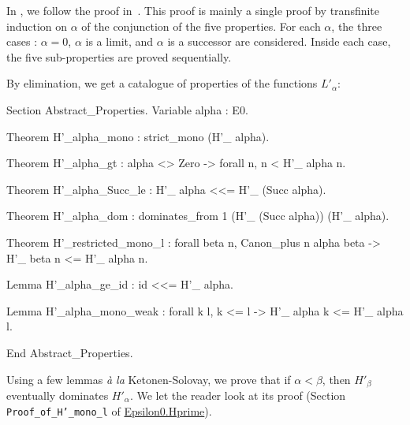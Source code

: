 
In \coq{}, we follow the  proof in~\cite{KS81}. This proof is mainly a single  proof by transfinite induction on $\alpha$ of the conjunction of the five properties.
For each $\alpha$, the three cases : $\alpha=0$, $\alpha$ is a limit, and 
$\alpha$ is a successor are considered. Inside each case, the five sub-properties are proved sequentially. 






By elimination, we get a catalogue of properties of the functions $L'_\alpha$:

\begin{Coqsrc}
Section Abstract_Properties.
 Variable alpha : E0.

 Theorem H'_alpha_mono : strict_mono (H'_ alpha).

 Theorem H'_alpha_gt : alpha <> Zero ->
        forall n, n < H'_ alpha n.

 Theorem H'_alpha_Succ_le :
        H'_ alpha <<= H'_ (Succ alpha).
  
 Theorem H'_alpha_dom :
    dominates_from 1 (H'_ (Succ alpha)) (H'_ alpha).

 Theorem H'_restricted_mono_l :
    forall beta n, Canon_plus n alpha beta -> 
                                 H'_ beta n <= H'_ alpha n.

  Lemma H'_alpha_ge_id : id <<= H'_ alpha.

  Lemma H'_alpha_mono_weak : forall k l, k <= l ->
                                        H'_ alpha k <= H'_ alpha l.
  
End Abstract_Properties.
\end{Coqsrc}

Using a few lemmas \emph{à la} Ketonen-Solovay, we prove that
if $\alpha<\beta$, then $H'_\beta$ eventually dominates
$H'_\alpha$.
We let the reader look at its proof (Section \texttt{Proof\_of\_H'\_mono\_l} of \href{../theories/html/hydras.Epsilon0.Hprime.html\#H_}{Epsilon0.Hprime}).

